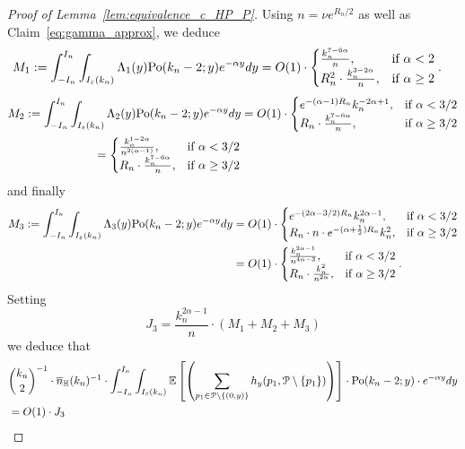 \begin{proof}[Proof of Lemma~\ref{lem:equivalence_c_HP_P}]
Using $n=\nu e^{R_n/2}$ as well as Claim~\ref{eq:gamma_approx}, 
we deduce
\begin{align*} 
M_1:= \int_{-I_n}^{I_n} \int_{I_\eps (k_n)} \Lambda_1 (y)  \Pop{y}{k_n-2} e^{-\alpha y} dy
&= O(1) \cdot 
\begin{cases} 
\frac{k_n^{7-6\alpha}}{n}, & \mbox{if $\alpha <2$} \\
R_n^2 \cdot \frac{k_n^{3-2\alpha}}{n}, & \mbox{if $\alpha \geq 2$}
\end{cases}. 
\end{align*}
\begin{align*} 
M_2:= \int_{-I_n}^{I_n} \int_{I_\eps (k_n)} \Lambda_2 (y)  \Pop{y}{k_n-2} e^{-\alpha y} dy
&= O(1) \cdot 
\begin{cases}
e^{-(\alpha - 1)R_n} k_n^{-2\alpha+1}, & \mbox{if $\alpha < 3/2$} \\
R_n  \cdot \frac{k_n^{7-6\alpha }}{n}, & \mbox{if $\alpha \geq 3/2$}
\end{cases} 
\\
=\begin{cases}
\frac{k_n^{1-2\alpha}}{n^{2(\alpha-1)}}, & \mbox{if $\alpha < 3/2$} \\
R_n  \cdot \frac{k_n^{7-6\alpha }}{n}, & \mbox{if $\alpha \geq 3/2$}
\end{cases}
\end{align*}
and finally 
\begin{align*} 
M_3:=\int_{-I_n}^{I_n} \int_{I_\eps (k_n)} \Lambda_3 (y)  \Pop{y}{k_n-2} e^{-\alpha y} dy
&= O(1) \cdot 
\begin{cases} 
e^{-(2\alpha - 3/2) R_n} k_n^{2\alpha - 1}, & \mbox{if $\alpha <3/2$} \\ 
R_n \cdot n \cdot e^{-(\alpha +\frac12)R_n} k_n^2, &\mbox{if $\alpha \geq 3/2$}
\end{cases} \\
&=O(1) \cdot 
\begin{cases} 
\frac{k_n^{2\alpha - 1}}{n^{4\alpha -3}}, & \mbox{if $\alpha <3/2$} \\ 
R_n \cdot \frac{k_n^2}{n^{2\alpha}}, &\mbox{if $\alpha \geq 3/2$}
\end{cases}  .
\end{align*}
Setting 
$$ J_3 = \frac{k_n^{2\alpha-1}}{n}\cdot  \left(M_1+ M_2 + M_3 \right) $$
we deduce that 
\begin{align*}
&{k_n\choose 2}^{-1}\cdot \expH^{-1} \cdot \int_{-I_n}^{I_n} \int_{I_\eps (k_n)} \Exp{\left( \sum_{p_1 \in \Pcal \setminus \{(0,y)\}} h_y (p_1, \Pcal \setminus \{ p_1 \})\right)} \cdot  \Pop{y}{k_n-2} \cdot e^{-\alpha y} dy \\
&= O(1) \cdot J_3
\end{align*}



\end{proof}
